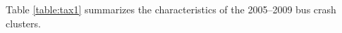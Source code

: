 \noindent
Table \ref{table:tax1} summarizes the characteristics of the 2005--2009 bus crash clusters. 
